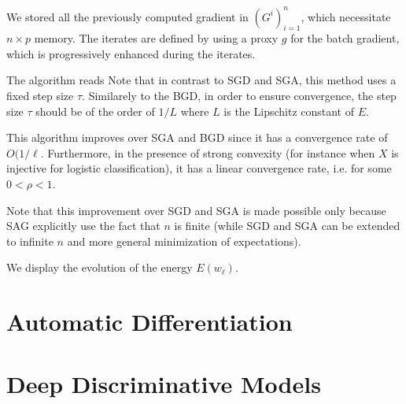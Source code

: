 We stored all the previously computed gradient in $ (G^i)_{i=1}^n $,
which necessitate $n \times p$ memory. 
The iterates are defined by using a proxy $g$ for the batch gradient,
which is progressively enhanced during the iterates.

The algorithm reads
Note that in contrast to SGD and SGA, this method uses a fixed step
size $\tau$. Similarely to the BGD, in order to ensure convergence, 
the step size $\tau$ should be of the order of $1/L$
where $L$ is the Lipschitz constant of $E$.


This algorithm improves over SGA and BGD
since it has a convergence rate of $O(1/\ell$. 
Furthermore, in the presence of strong convexity (for instance when $X$ is
injective for logistic classification), it has a linear convergence rate, 
i.e. 
for some $0 < \rho < 1$. 

Note that this improvement over SGD and SGA is made possible only because
SAG explicitly use the fact that $n$ is finite (while SGD and SGA can
be extended to infinite $n$ and more general minimization of
expectations).


We display the evolution of the energy $E(w_\ell)$.



\section{Automatic Differentiation}


\section{Deep Discriminative Models}


